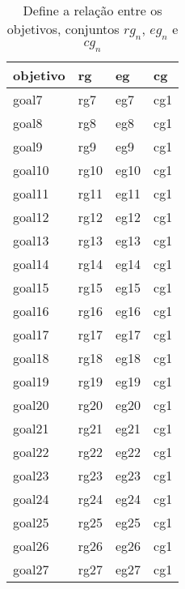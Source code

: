 \begin{table}[H]
\centering
{}
\begin{tabular}{|l|l|l|l|}
\hline
\textbf{objetivo}  & \textbf{rg} & \textbf{eg} & \textbf{cg} \\ \hline
goal7  	& rg7  & eg7  & cg1 \\ \hline
goal8  	& rg8  & eg8  & cg1 \\ \hline
goal9  	& rg9  & eg9  & cg1 \\ \hline
goal10 	& rg10 & eg10 & cg1 \\ \hline
goal11 	& rg11 & eg11 & cg1 \\ \hline
goal12 	& rg12 & eg12 & cg1 \\ \hline
goal13 	& rg13 & eg13 & cg1 \\ \hline
goal14 	& rg14 & eg14 & cg1 \\ \hline
goal15 	& rg15 & eg15 & cg1 \\ \hline
goal16 	& rg16 & eg16 & cg1 \\ \hline
goal17 	& rg17 & eg17 & cg1 \\ \hline
goal18 	& rg18 & eg18 & cg1 \\ \hline
goal19 	& rg19 & eg19 & cg1 \\ \hline
goal20 	& rg20 & eg20 & cg1 \\ \hline
goal21 	& rg21 & eg21 & cg1 \\ \hline
goal22 	& rg22 & eg22 & cg1 \\ \hline
goal23 	& rg23 & eg23 & cg1 \\ \hline
goal24 	& rg24 & eg24 & cg1 \\ \hline
goal25 	& rg25 & eg25 & cg1 \\ \hline
goal26 	& rg26 & eg26 & cg1 \\ \hline
goal27 	& rg27 & eg27 & cg1 \\ \hline
\end{tabular}
\caption{Define a relação entre os objetivos, conjuntos $rg_n$, $eg_n$ e $cg_n$ }
\label{goalsrelationsentity2}
\end{table}